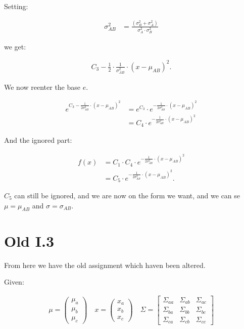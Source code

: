 Setting:

\begin{align*}
\sigma_{AB}^2 &= \frac{(\sigma_B^2 + \sigma_A^2)}{\sigma_A^2 \cdot \sigma_B^2}
\end{align*}

we get:

\begin{align*}
C_3 - \frac{1}{2} \cdot \frac{1}{\sigma_{AB}^2} \cdot (x - \mu_{AB})^2.
\end{align*}

We now reenter the base $e$.

\begin{align*}
e^{C_3 - \frac{1}{2\sigma_{AB}^2} \cdot (x - \mu_{AB})^2}
&=
e^{C_3} \cdot e^{- \frac{1}{2\sigma_{AB}^2} \cdot (x - \mu_{AB})^2} \\
&= C_4 \cdot e^{- \frac{1}{2\sigma_{AB}^2} \cdot (x - \mu_{AB})^2}
\end{align*}

And the ignored part:

\begin{align*}
f(x) &= C_1 \cdot C_4 \cdot e^{- \frac{1}{2\sigma_{AB}^2} \cdot (x - \mu_{AB})^2} \\
&= C_5 \cdot e^{- \frac{1}{2\sigma_{AB}^2} \cdot (x - \mu_{AB})^2}.
\end{align*}

$C_5$ can still be ignored, and we are now on the form we want, and we can se $\mu = \mu_{AB}$ and $\sigma = \sigma_{AB}$.

\section*{Old I.3}

From here we have the old assignment which haven been altered.

Given:

\begin{align*}
	\mu = \begin{pmatrix}
		\mu_a \\
		\mu_b \\
		\mu_c
	\end{pmatrix} \quad
	x = \begin{pmatrix}
		x_a \\
		x_b \\
		x_c
	\end{pmatrix} \quad
	\Sigma = \begin{bmatrix}
		\Sigma_{aa} & \Sigma_{ab} & \Sigma_{ac} \\
		\Sigma_{ba} & \Sigma_{bb} & \Sigma_{bc} \\
		\Sigma_{ca} & \Sigma_{cb} & \Sigma_{cc}
	\end{bmatrix}
\end{align*}

